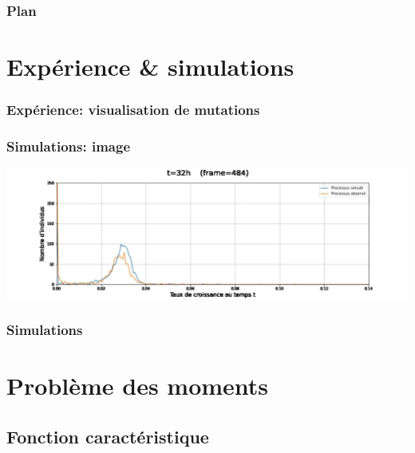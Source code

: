 \documentclass{beamer}
\begin{document}
\begin{frame}
  \frametitle{Plan}
  \tableofcontents
\end{frame}

\section{Expérience \& simulations}
\begin{frame}
  \sectionpage
\end{frame}

\begin{frame}
  \frametitle{Expérience: visualisation de mutations}
  
\end{frame}

\begin{frame}
\frametitle{Simulations: image}
\centering
\includegraphics[scale=0.18]{img/proj_sshot_ani1.png}

\end{frame}

\begin{frame}
  \frametitle{Simulations}
  \center{}
\end{frame}


\section{Problème des moments}

\begin{frame}
  \sectionpage
\end{frame}

\subsection{Fonction caractéristique}
\end{document}
